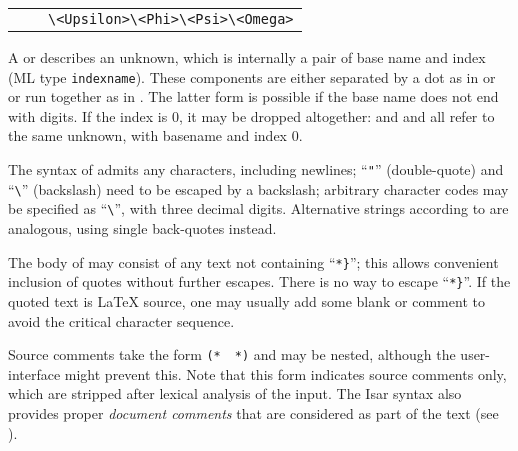 \begin{isabellebody}
\begin{isamarkuptext}
\begin{center}
\begin{supertabular}{rcl}
          &   & \verb|\<Upsilon>|\isa{{\isachardoublequote}\ \ {\isacharbar}\ \ {\isachardoublequote}}\verb|\<Phi>|\isa{{\isachardoublequote}\ \ {\isacharbar}\ \ {\isachardoublequote}}\verb|\<Psi>|\isa{{\isachardoublequote}\ \ {\isacharbar}\ \ {\isachardoublequote}}\verb|\<Omega>| \\
  \end{supertabular}
  \end{center}

  A \hyperlink{syntax.var}{\mbox{}} or \hyperlink{syntax.typevar}{\mbox{}} describes an unknown,
  which is internally a pair of base name and index (ML type \verb|indexname|).  These components are either separated by a dot as in
   or  or run together as in .  The latter form is possible if the base name does not end
  with digits.  If the index is 0, it may be dropped altogether:
   and  and  all refer to the
  same unknown, with basename  and index 0.

  The syntax of \hyperlink{syntax.string}{\mbox{}} admits any characters, including
  newlines; ``\verb|"|'' (double-quote) and ``\verb|\|'' (backslash) need to be escaped by a backslash; arbitrary
  character codes may be specified as ``\verb|\|'',
  with three decimal digits.  Alternative strings according to
  \hyperlink{syntax.altstring}{\mbox{}} are analogous, using single back-quotes
  instead.

  The body of \hyperlink{syntax.verbatim}{\mbox{}} may consist of any text not
  containing ``\verb|*|\verb|}|''; this allows
  convenient inclusion of quotes without further escapes.  There is no
  way to escape ``\verb|*|\verb|}|''.  If the quoted
  text is {\LaTeX} source, one may usually add some blank or comment
  to avoid the critical character sequence.

  Source comments take the form \verb|(*|~\isa{{\isachardoublequote}{\isasymdots}{\isachardoublequote}}~\verb|*)| and may be nested, although the user-interface
  might prevent this.  Note that this form indicates source comments
  only, which are stripped after lexical analysis of the input.  The
  Isar syntax also provides proper \emph{document comments} that are
  considered as part of the text (see ).


\end{isamarkuptext}
\end{isabellebody}
